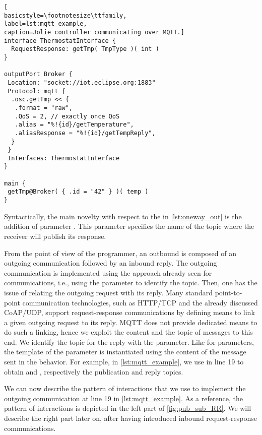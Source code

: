 \begin{lstlisting}[
basicstyle=\footnotesize\ttfamily,
label=lst:mqtt_example,
caption=Jolie controller communicating over MQTT.]
interface ThermostatInterface {
  RequestResponse: getTmp( TmpType )( int )
}

outputPort Broker {
 Location: "socket://iot.eclipse.org:1883"
 Protocol: mqtt {
  .osc.getTmp << {
   .format = "raw",
   .QoS = 2, // exactly once QoS
   .alias = "%!{id}/getTemperature",
   .aliasResponse = "%!{id}/getTempReply",
  }
 }
 Interfaces: ThermostatInterface
}

main {
 getTmp@Broker( { .id = "42" } )( temp )
}
\end{lstlisting}

Syntactically, the main novelty with respect to the  in
\cref{lst:oneway_out} is the addition of  parameter
. This parameter specifies the name of the topic
where the receiver will publish its response.

From the point of view of the programmer, an outbound  is
composed of an outgoing communication followed by an inbound reply. The outgoing
communication is implemented using the approach already seen for 
communications, i.e., using the   parameter to
identify the topic. Then, one has the issue of relating the outgoing request
with its reply. Many standard point-to-point communication technologies, such as
HTTP/TCP and the already discussed CoAP/UDP, support request-response
communications by defining means to link a given outgoing request to its reply.
MQTT does not provide dedicated means to do such a linking, hence we exploit the
content and the topic of messages to this end.
%
We identify the topic for the reply with the
  parameter. Like for 
parameters, the template of the  parameter is instantiated
using the content of the message sent in the behavior. For example, in
\cref{lst:mqtt_example}, we use  in line 19 to obtain
 and , respectively the
publication and reply topics.

We can now describe the pattern of interactions that we use to implement the
outgoing  communication at line 19 in
\cref{lst:mqtt_example}. As a reference, the pattern of interactions is depicted
in the left part of \cref{fig:pub_sub_RR}. We will describe the right part later
on, after having introduced inbound request-response communications.

